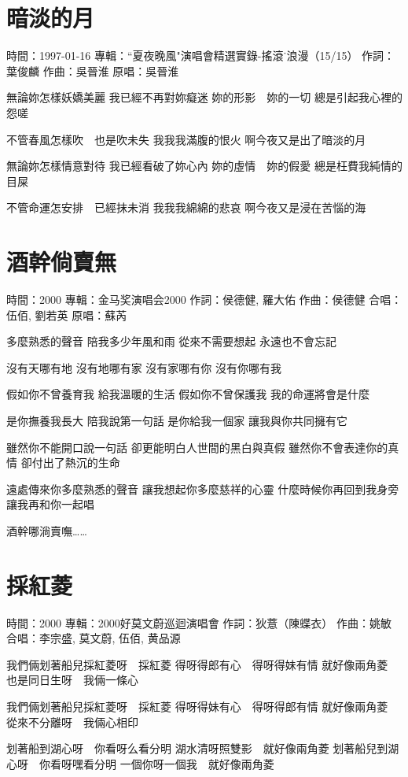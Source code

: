 \documentclass[UTF8,a4paper,oneside,twocolumn,12pt]{ctexbook}
\newcommand{\infopair}[2]{\textbullet #1：#2}
\newcommand{\zc}[1][伍佰]{\infopair{作詞}{#1}}
\newcommand{\zq}[1][伍佰]{\infopair{作曲}{#1}}
\newcommand{\zj}[1]{\infopair{專輯}{#1}}
\newcommand{\yc}[1]{\infopair{原唱}{#1}}
\newcommand{\sj}[1]{\infopair{時間}{#1}}
\newenvironment{info}{\begin{flushleft}\kaishu
	}
	{\end{flushleft}\normalsize\yahei\par}
\newenvironment{lyric}{
	}
{}
\begin{document}
\section{暗淡的月}
\begin{info}
	\sj{1997-01-16}
	\zj{``夏夜晚風"演唱會精選實錄-搖滾˙浪漫（15/15）}
	\zc[葉俊麟]
	\zq[吳晉淮]
	\yc{吳晉淮}
\end{info}
\begin{lyric}
	無論妳怎樣妖嬌美麗
	我已經不再對妳癡迷
	妳的形影　妳的一切
	總是引起我心裡的怨嗟

	不管春風怎樣吹　也是吹未失
	我我我滿腹的恨火
	啊今夜又是出了暗淡的月

	無論妳怎樣情意對待
	我已經看破了妳心內
	妳的虛情　妳的假愛
	總是枉費我純情的目屎

	不管命運怎安排　已經抹未消
	我我我綿綿的悲哀
	啊今夜又是浸在苦惱的海
\end{lyric}

\section{酒幹倘賣無}
\begin{info}
	\sj{2000}
	\zj{金马奖演唱会2000}
	\zc[侯德健, 羅大佑]
	\zq[侯德健]
	\infopair{合唱}{伍佰, 劉若英}
	\yc{蘇芮}
\end{info}
\begin{lyric}
	多麼熟悉的聲音
	陪我多少年風和雨
	從來不需要想起
	永遠也不會忘記

	沒有天哪有地
	沒有地哪有家
	沒有家哪有你
	沒有你哪有我

	假如你不曾養育我
	給我溫暖的生活
	假如你不曾保護我
	我的命運將會是什麼

	是你撫養我長大
	陪我說第一句話
	是你給我一個家
	讓我與你共同擁有它

	雖然你不能開口說一句話
	卻更能明白人世間的黑白與真假
	雖然你不會表達你的真情
	卻付出了熱沉的生命

	遠處傳來你多麼熟悉的聲音
	讓我想起你多麼慈祥的心靈
	什麼時候你再回到我身旁
	讓我再和你一起唱

	酒幹哪淌賣嘸……
\end{lyric}

\section{採紅菱}
\begin{info}
	\sj{2000}
	\zj{2000好莫文蔚巡迴演唱會}
	\zc[狄薏（陳蝶衣）]
	\zq[姚敏]
	\infopair{合唱}{李宗盛, 莫文蔚, 伍佰, 黄品源}
\end{info}
\begin{lyric}
	我們倆划著船兒採紅菱呀　採紅菱
	得呀得郎有心　得呀得妹有情
	就好像兩角菱　也是同日生呀　我倆一條心

	我們倆划著船兒採紅菱呀　採紅菱
	得呀得妹有心　得呀得郎有情
	就好像兩角菱　從來不分離呀　我倆心相印

	划著船到湖心呀　你看呀么看分明
	湖水清呀照雙影　就好像兩角菱
	划著船兒到湖心呀　你看呀嘿看分明
	一個你呀一個我　就好像兩角菱
\end{lyric}
\end{document}
